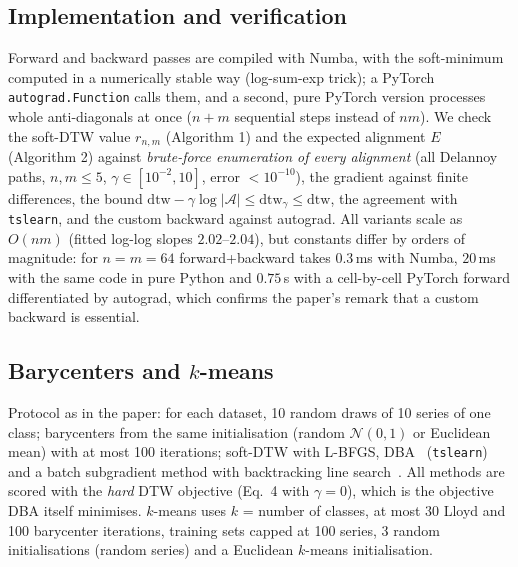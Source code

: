 \documentclass[11pt]{article}
\newcommand{\sdtw}{\mathrm{dtw}_\gamma}
\begin{document}
\subsection{Implementation and verification}
Forward and backward passes are compiled with Numba, with the soft-minimum computed in a numerically stable way (log-sum-exp trick); a PyTorch \texttt{autograd.Function} calls them, and a second, pure PyTorch version processes whole anti-diagonals at once ($n+m$ sequential steps instead of $nm$). We check the soft-DTW value $r_{n,m}$ (Algorithm 1) and the expected alignment $E$ (Algorithm 2) against \emph{brute-force enumeration of every alignment} (all Delannoy paths, $n,m\le5$, $\gamma\in[10^{-2},10]$, error $<10^{-10}$), the gradient against finite differences, the bound $\mathrm{dtw}-\gamma\log|\mathcal A|\le\sdtw\le\mathrm{dtw}$, the agreement with \texttt{tslearn}, and the custom backward against autograd. All variants scale as $O(nm)$ (fitted log-log slopes $2.02$--$2.04$), but constants differ by orders of magnitude: for $n=m=64$ forward+backward takes $0.3$\,ms with Numba, $20$\,ms with the same code in pure Python and $0.75$\,s with a cell-by-cell PyTorch forward differentiated by autograd, which confirms the paper's remark that a custom backward is essential.

\subsection{Barycenters and $k$-means}
Protocol as in the paper: for each dataset, 10 random draws of 10 series of one class; barycenters from the same initialisation (random $\mathcal N(0,1)$ or Euclidean mean) with at most 100 iterations; soft-DTW with L-BFGS, DBA~\cite{petitjean2011global} (\texttt{tslearn}) and a batch subgradient method with backtracking line search~\cite{schultz2018nonsmooth}. All methods are scored with the \emph{hard} DTW objective (Eq.~4 with $\gamma=0$), which is the objective DBA itself minimises. $k$-means uses $k$ = number of classes, at most 30 Lloyd and 100 barycenter iterations, training sets capped at 100 series, 3 random initialisations (random series) and a Euclidean $k$-means initialisation.
\end{document}
